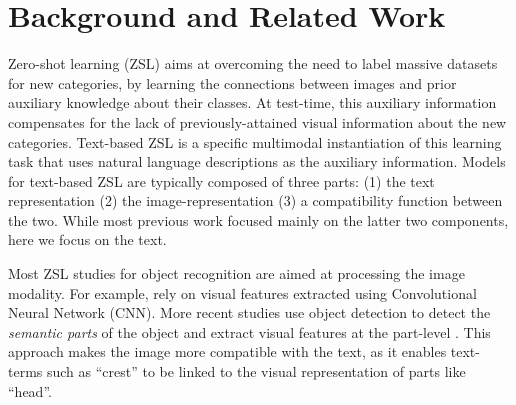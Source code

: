 \documentclass[11pt,a4paper]{article}
\newcommand\yuval[1]{\textcolor{darkpink}{\textbf{YUVAL:} #1 }}
\newcommand\tzuf[1]{\textcolor{blue}{\textbf{TZUF:} #1 }}
\newcommand\reut[1]{\textcolor{green}{\textbf{REUT:} #1 }}
\begin{document}
\section{Background and Related Work}
Zero-shot learning (ZSL) %
aims at overcoming the need to label massive datasets for new categories, by learning the connections between images and prior auxiliary knowledge about their classes. At test-time, this auxiliary information compensates for the lack of previously-attained visual information about the new categories.
Text-based ZSL is a specific multimodal instantiation of this learning task that uses natural language descriptions as the auxiliary information. Models for text-based ZSL are typically composed of three parts: (1) the text representation (2) the image-representation (3) a compatibility function between the two.  While most previous work focused mainly on the latter two components, here we %
focus on the text. 

Most ZSL studies  for object recognition are aimed at processing the image modality. For example, \citet{xu2018attngan,lei2015predicting,qiao2016less,akata2016multi} rely on visual features extracted using 
Convolutional Neural Network (CNN). More recent studies use object detection to detect the {\em semantic parts} of the object and extract visual features at the part-level \cite{elhoseiny2017link,zhu2018generative,zhang2016spda}. This
approach makes the image more compatible with the text, as it enables text-terms such as \enquote{crest} to be linked to the visual representation of parts like \enquote{head}. 
\end{document}
